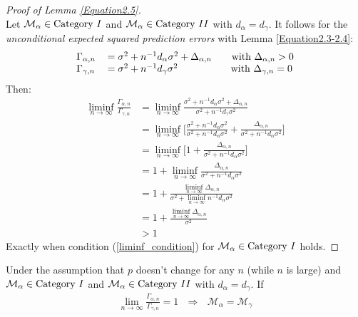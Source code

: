 \documentclass[Research_Module_ES.tex]{subfiles}
\begin{document}
\begin{proof}[Proof of Lemma \ref{Equation2.5}]~\\
	Let $\mathcal{M}_\alpha\in\text{Category}~\RM{1}$ and $\mathcal{M}_\alpha\in\text{Category}~\RM{2}$ with $d_\alpha=d_\gamma$. It follows for the \textit{unconditional expected squared prediction errors} with Lemma \ref{Equation2.3-2.4}:
	\begin{align*}
	\begin{tabular}{ll}
	$\Gamma_{\alpha,n}$&$=\sigma^2+n^{-1}d_\alpha\sigma^2+\Delta_{\alpha,n}~~~~~$ with $\Delta_{\alpha,n}>0$\\
	$\Gamma_{\gamma,n}$&$=\sigma^2+n^{-1}d_\gamma\sigma^2~~~~~~~~~~~~~~~~$with $\Delta_{\gamma,n}=0$
	\end{tabular}
	\end{align*}
	Then:
	\begin{align*}
	\liminf_{n\rightarrow\infty}\frac{\Gamma_{\alpha,n}}{\Gamma_{\gamma,n}}&=\liminf_{n\rightarrow\infty}\frac{\sigma^2+n^{-1}d_\alpha\sigma^2+\Delta_{\alpha,n}}{\sigma^2+n^{-1}d_\gamma\sigma^2}	\\
	&=\liminf_{n\rightarrow\infty}\Big[\frac{\sigma^2+n^{-1}d_\alpha\sigma^2}{\sigma^2+n^{-1}d_\alpha\sigma^2}+\frac{\Delta_{\alpha,n}}{\sigma^2+n^{-1}d_\alpha\sigma^2}\Big]\\
	&=\liminf_{n\rightarrow\infty}\Big[1+\frac{\Delta_{\alpha,n}}{\sigma^2+n^{-1}d_\alpha\sigma^2}\Big]\\
	&=1+\liminf_{n\rightarrow\infty}\frac{\Delta_{\alpha,n}}{\sigma^2+n^{-1}d_\alpha\sigma^2}\\
	&=1+\frac{\liminf_{n\rightarrow\infty}\Delta_{\alpha,n}}{\sigma^2+ \liminf_{n\rightarrow\infty} n^{-1}d_\alpha\sigma^2}\\
	&=1+\frac{\liminf_{n\rightarrow\infty}\Delta_{\alpha,n}}{\sigma^2}\\
	&>1
	\end{align*}
	Exactly when condition (\ref{liminf_condition}) for $\mathcal{M}_\alpha\in\text{Category}~\RM{1}$ holds.
\end{proof}

\begin{lemma}
	\label{Equation2.5 condition does not hold}
	Under the assumption that $p$ doesn't change for any $n$ (while $n$ is large) and $\mathcal{M}_\alpha\in\text{Category}~\RM{1}$ and $\mathcal{M}_\alpha\in\text{Category}~\RM{2}$ with $d_\alpha=d_\gamma$. If
	\begin{align*}
		\lim_{n\rightarrow\infty}\frac{\Gamma_{\alpha,n}}{\Gamma_{\gamma,n}}=1~~~\Rightarrow~~~\mathcal{M}_\alpha=\mathcal{M}_\gamma
	\end{align*} 
\end{lemma}
\end{document}
